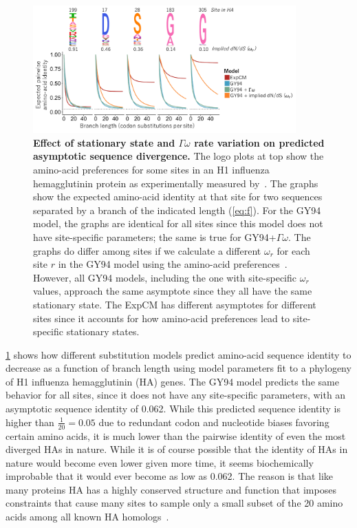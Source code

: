 \documentclass[11pt]{article}
\begin{document}
\begin{figure}
\centerline{\includegraphics[width=0.90\textwidth]{figures/decay.pdf}}
\caption{\label{fig:decay}
\textbf{Effect of stationary state and $\Gamma\omega$ rate variation on predicted asymptotic sequence divergence.}
The logo plots at top show the amino-acid preferences for some sites in an H1 influenza hemagglutinin protein as experimentally measured by~\citet{doud2016accurate}.
The graphs show the expected amino-acid identity at that site for two sequences separated by a branch of the indicated length (\ref{eq:f}).
For the GY94 model, the graphs are identical for all sites since this model does not have site-specific parameters; the same is true for GY94+$\Gamma\omega$.
The graphs do differ among sites if we calculate a different $\omega_r$ for each site $r$ in the GY94 model using the amino-acid preferences~\citep[\ref{eq:w_r};][]{spielman2015relationship}.
However, all GY94 models, including the one with site-specific $\omega_r$ values, approach the same asymptote since they all have the same stationary state.
The ExpCM has different asymptotes for different sites since it accounts for how amino-acid preferences lead to site-specific stationary states.
}
\end{figure}

\ref{fig:decay} shows how different substitution models predict amino-acid sequence identity to decrease as a function of branch length using model parameters fit to a phylogeny of H1 influenza hemagglutinin (HA) genes.
The GY94 model predicts the same behavior for all sites, since it does not have any site-specific parameters, with an asymptotic sequence identity of 0.062. 
While this predicted sequence identity is higher than $\frac{1}{20} = 0.05$ due to redundant codon and nucleotide biases favoring certain amino acids, it is much lower than the pairwise identity of even the most diverged HAs in nature.
While it is of course possible that the identity of HAs in nature would become even lower given more time, it seems biochemically improbable that it would ever become as low as 0.062. 
The reason is that like many proteins HA has a highly conserved structure and function that imposes constraints that cause many sites to sample only a small subset of the 20 amino acids among all known HA homologs~\citep{nobusawa1991comparison}.
\end{document}
